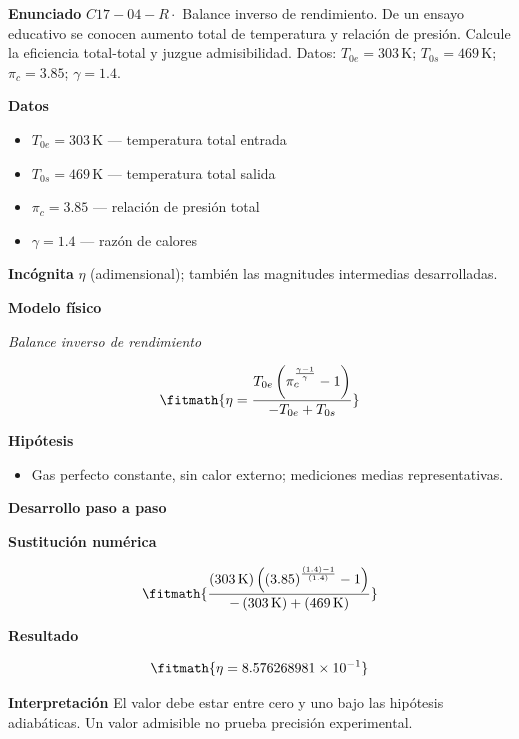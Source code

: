 \documentclass[10pt,openany]{book}
\begin{document}
\begin{tcolorbox}[title={Problema resuelto 4}, studiumworked, breakable]

\noindent\textbf{Enunciado}
\(C17-04-R \cdot\) Balance inverso de rendimiento. De un ensayo educativo se conocen aumento total de temperatura y relación de presión. Calcule la eficiencia total-total y juzgue admisibilidad. Datos: \(T_{0e}=303\, \mathrm{K}\); \(T_{0s}=469\, \mathrm{K}\); \(\pi_c=3.85\); \(\gamma=1.4\).

\noindent\textbf{Datos}
\begin{itemize}
\item $T_{0e} = 303\,\mathrm{K}$ — temperatura total entrada
\item $T_{0s} = 469\,\mathrm{K}$ — temperatura total salida
\item $\pi_c = 3.85$ — relación de presión total
\item $\gamma = 1.4$ — razón de calores
\end{itemize}

\noindent\textbf{Incógnita}
$\eta$ (adimensional); también las magnitudes intermedias desarrolladas.

\noindent\textbf{Modelo físico}

\noindent\textit{Balance inverso de rendimiento}

\[
\fitmath{\eta=\frac{T_{0e} \left(\pi_c^{\frac{\gamma - 1}{\gamma}} - 1\right)}{- T_{0e} + T_{0s}}}
\]

\noindent\textbf{Hipótesis}
\begin{itemize}
\item Gas perfecto constante, sin calor externo; mediciones medias representativas.
\end{itemize}

\noindent\textbf{Desarrollo paso a paso}



\noindent\textbf{Sustitución numérica}

\[
\fitmath{\frac{\left(303\,\mathrm{K}\right) \left(\left(3.85\right)^{\frac{\left(1.4\right) - 1}{\left(1.4\right)}} - 1\right)}{- \left(303\,\mathrm{K}\right) + \left(469\,\mathrm{K}\right)}}
\]

\noindent\textbf{Resultado}

\[
\fitmath{\eta=8.576268981\times10^{-1}}
\]

\noindent\textbf{Interpretación}
El valor debe estar entre cero y uno bajo las hipótesis adiabáticas. Un valor admisible no prueba precisión experimental.


\end{tcolorbox}
\end{document}
